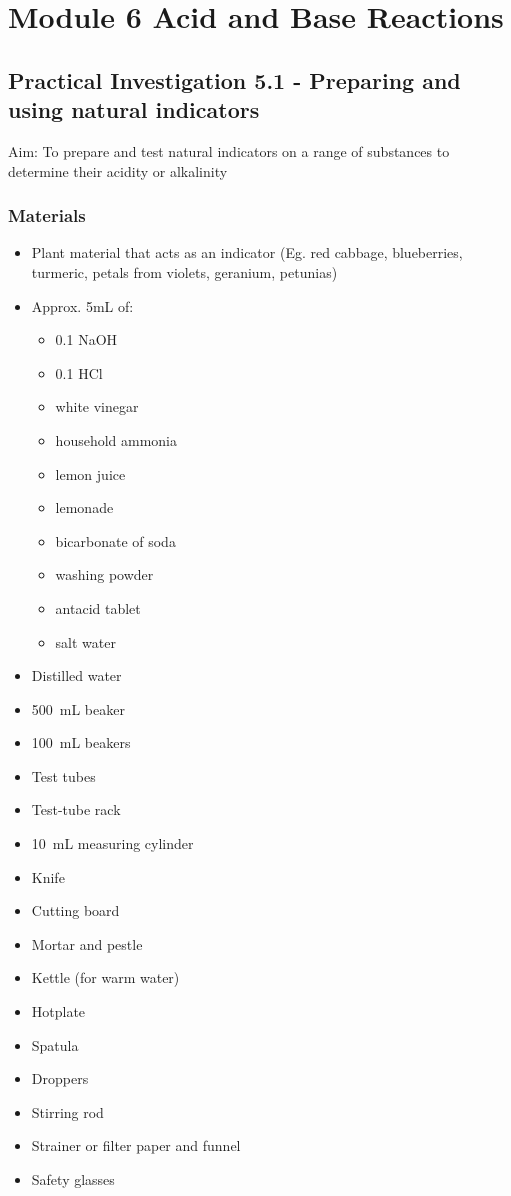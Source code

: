 
\chapter{Module 6 \hspace{0.5em} Acid and Base Reactions} \label{12/12/2024}

	\section{Practical Investigation 5.1 - Preparing and using natural indicators}

	Aim: To prepare and test natural indicators on a range of substances to determine their acidity or alkalinity

	\subsection{Materials}
		\begin{itemize}
			\item Plant material that acts as an indicator (Eg. red cabbage, blueberries, turmeric, petals from violets, geranium, petunias)
			\item Approx. 5mL of:
			\begin{itemize}
				\item \qty{0.1}{\moLar} NaOH
				\item \qty{0.1}{\moLar} HCl
				\item white vinegar
				\item household ammonia
				\item lemon juice
				\item lemonade
				\item bicarbonate of soda
				\item washing powder
				\item antacid tablet
				\item salt water
			\end{itemize}
			\item Distilled water
			\item \qty{500}{mL} beaker
			\item \qty{100}{mL} beakers
			\item Test tubes
			\item Test-tube rack
			\item \qty{10}{mL} measuring cylinder
			\item Knife
			\item Cutting board
			\item Mortar and pestle
			\item Kettle (for warm water)
			\item Hotplate
			\item Spatula
			\item Droppers
			\item Stirring rod
			\item Strainer or filter paper and funnel
			\item Safety glasses
		\end{itemize}

